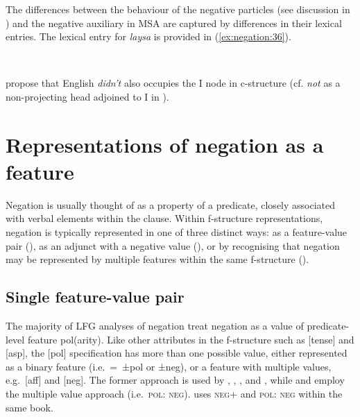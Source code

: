 \documentclass[output=paper,hidelinks]{langscibook}
\begin{document}
The differences between the behaviour of the negative particles (see discussion in ) and the negative auxiliary in MSA are captured by differences in their lexical entries. The lexical entry for \emph{laysa} is provided in (\ref{ex:negation:36}).

\ea\label{ex:negation:36}
\\
\citep [24]{AlsharifSadler:09}
\z

\citet[87]{DN} propose that English \emph{didn't} also occupies the I node in c-structure (cf. \emph{not} as a non-projecting head adjoined to I in ).


\section{Representations of negation as a feature}
\label{sec:negation:f-structure}

Negation is usually thought of as a property of a predicate, closely associated with verbal elements within the clause. Within f-structure representations, negation is typically represented in one of three distinct ways: as a feature-value pair (), as an adjunct with a negative value (), or by recognising that negation may be represented by multiple features within the same f-structure ().

\subsection{Single feature-value pair}
\label{sec:negation:single-feature}
\largerpage
The majority of LFG analyses of negation treat negation as a value of predicate-level feature {\sc pol}(arity). Like other attributes in the f-structure such as [{\sc tense}] and [{\sc asp}], the [{\sc pol}] specification has more than one possible value, either represented as a binary feature (i.e.\ =\ ±{\sc pol} or ±{\sc neg}), or a feature with multiple values, e.g.\ [{\sc aff}] and [{\sc neg}]. The former approach is used by \citet{King95}, \citet{Nino1997}, \citet{ButtEtAl1999}, \citet [183] {bresnan2001lexical} and  \citet[87]{DN} , while \citet{AlsharifSadler:09} and \citet{Bond2016} employ the multiple value approach (i.e.\ \textsc{pol: neg}). \citet [12, 149] {falk2001lexical} uses \textsc{neg}+ and \textsc{pol: neg} within the same book.
\end{document}

